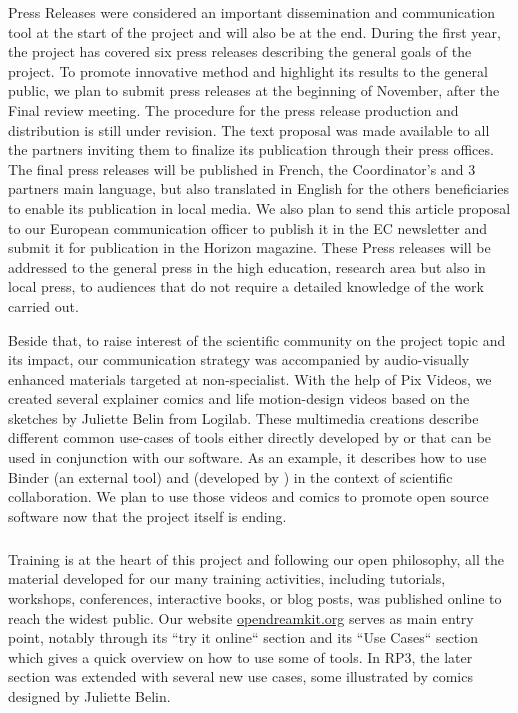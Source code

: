 Press Releases were considered an important dissemination and communication tool at the start of the project and will also be at the end. During the  first year, the project has covered six press releases describing the general goals of the project. To promote \ODK innovative method and highlight its results to the general public, we plan to submit press releases at the beginning of November, after the Final review meeting. The procedure for the press release production and distribution is still under revision. The text proposal was made available to all the partners  inviting them to finalize its publication through their press offices. The final press releases will be published in French, the Coordinator’s and 3 partners main language, but also translated in English for the others beneficiaries to enable its publication in local media. We also plan to send this article proposal to our European communication officer to publish it in the EC newsletter and submit it for publication in the Horizon magazine.  These Press releases will  be  addressed  to   the general press in the high education, research area but also in local press, to audiences that do not require a detailed knowledge of the work carried out.

 Beside that, to raise interest of the scientific community on the project topic and its impact, our communication strategy was accompanied by audio-visually enhanced materials targeted at non-specialist. With the help of Pix Videos, we created several explainer comics and life motion-design videos based on the sketches by Juliette Belin from Logilab. These multimedia creations describe different common use-cases of tools either directly developed by \ODK or that can be used in conjunction with our software. As an example, it describes how to use Binder (an external tool) and \Jupyter (developed by \ODK) in the context of scientific collaboration. We plan to use those videos and comics to promote open source software now that the project itself is ending.



\subparagraph{}

Training is at the heart of this project and following our open
philosophy, all the material developed for our many training
activities, including tutorials, workshops, conferences, interactive
books, or blog posts, was published online to reach the widest public.
Our website \url{opendreamkit.org} serves as main entry point, notably
through its ``try it online`` section and its ``Use Cases`` section
which gives a quick overview on how to use some of \ODK tools. In RP3,
the later section was extended with several new use cases, some
illustrated by comics designed by Juliette Belin.

